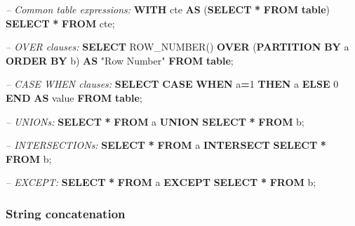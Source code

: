 \documentclass[11pt]{book}
\newenvironment{Shaded}{\begin{snugshade}}{\end{snugshade}}
\newcommand{\CommentTok}[1]{\textcolor[rgb]{0.56,0.35,0.01}{\textit{#1}}}
\newcommand{\ControlFlowTok}[1]{\textcolor[rgb]{0.13,0.29,0.53}{\textbf{#1}}}
\newcommand{\DecValTok}[1]{\textcolor[rgb]{0.00,0.00,0.81}{#1}}
\newcommand{\FunctionTok}[1]{\textcolor[rgb]{0.00,0.00,0.00}{#1}}
\newcommand{\KeywordTok}[1]{\textcolor[rgb]{0.13,0.29,0.53}{\textbf{#1}}}
\newcommand{\NormalTok}[1]{#1}
\newcommand{\OperatorTok}[1]{\textcolor[rgb]{0.81,0.36,0.00}{\textbf{#1}}}
\newcommand{\OtherTok}[1]{\textcolor[rgb]{0.56,0.35,0.01}{#1}}
\theoremstyle{definition}
\theoremstyle{definition}
\theoremstyle{definition}
\theoremstyle{remark}
\begin{document}
\begin{Shaded}
\begin{Highlighting}[]
\CommentTok{-- Common table expressions:}
\KeywordTok{WITH}\NormalTok{ cte }\KeywordTok{AS}\NormalTok{ (}\KeywordTok{SELECT} \OperatorTok{*} \KeywordTok{FROM} \KeywordTok{table}\NormalTok{) }\KeywordTok{SELECT} \OperatorTok{*} \KeywordTok{FROM}\NormalTok{ cte;}

\CommentTok{-- OVER clauses:}
\KeywordTok{SELECT} \FunctionTok{ROW_NUMBER}\NormalTok{() }\KeywordTok{OVER}\NormalTok{ (}\KeywordTok{PARTITION} \KeywordTok{BY}\NormalTok{ a }\KeywordTok{ORDER} \KeywordTok{BY}\NormalTok{ b)}
  \KeywordTok{AS} \OtherTok{"Row Number"} \KeywordTok{FROM} \KeywordTok{table}\NormalTok{;}
  
\CommentTok{-- CASE WHEN clauses:}
\KeywordTok{SELECT} \ControlFlowTok{CASE} \ControlFlowTok{WHEN}\NormalTok{ a}\OperatorTok{=}\DecValTok{1} \ControlFlowTok{THEN}\NormalTok{ a }\ControlFlowTok{ELSE} \DecValTok{0} \ControlFlowTok{END} \KeywordTok{AS} \FunctionTok{value} \KeywordTok{FROM} \KeywordTok{table}\NormalTok{;}

\CommentTok{-- UNIONs:}
\KeywordTok{SELECT} \OperatorTok{*} \KeywordTok{FROM}\NormalTok{ a }\KeywordTok{UNION} \KeywordTok{SELECT} \OperatorTok{*} \KeywordTok{FROM}\NormalTok{ b;}

\CommentTok{-- INTERSECTIONs:}
\KeywordTok{SELECT} \OperatorTok{*} \KeywordTok{FROM}\NormalTok{ a }\KeywordTok{INTERSECT} \KeywordTok{SELECT} \OperatorTok{*} \KeywordTok{FROM}\NormalTok{ b;}

\CommentTok{-- EXCEPT:}
\KeywordTok{SELECT} \OperatorTok{*} \KeywordTok{FROM}\NormalTok{ a }\KeywordTok{EXCEPT} \KeywordTok{SELECT} \OperatorTok{*} \KeywordTok{FROM}\NormalTok{ b;}
\end{Highlighting}
\end{Shaded}

\hypertarget{string-concatenation}{%
\subsubsection*{String concatenation}\label{string-concatenation}}
\end{document}
